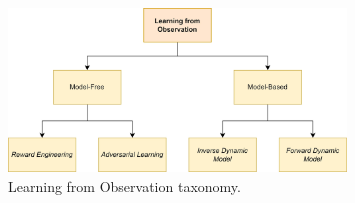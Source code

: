 \begin{figure}[t]
    \centering
    \includegraphics[width=0.8\textwidth]{figures/images/lfo_taxonomy.jpg}
    \caption{Learning from Observation taxonomy.}
    \label{fig:lfo_taxonomy}
    
\end{figure}
